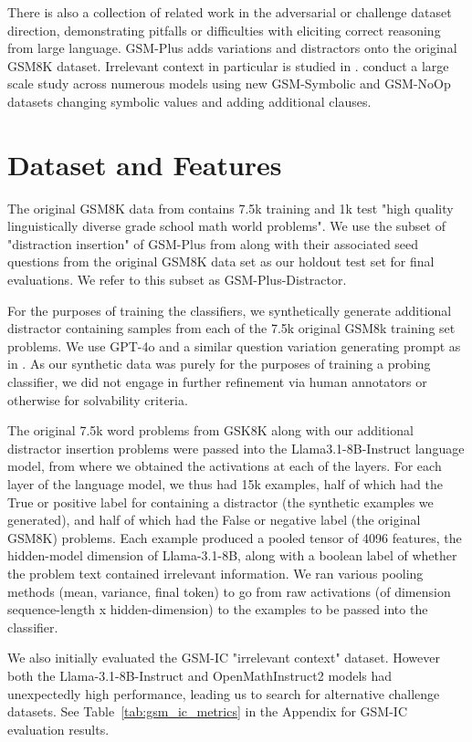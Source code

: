 \documentclass{article}
\begin{document}
There is also a collection of related work in the adversarial or challenge dataset direction, demonstrating pitfalls or difficulties with eliciting correct reasoning from large language. GSM-Plus \citep{li} adds variations and distractors onto the original GSM8K dataset. Irrelevant context in particular is studied in \citep{shi}. \citep{mirzadeh} conduct a large scale study across numerous models using new GSM-Symbolic and GSM-NoOp datasets changing symbolic values and adding additional clauses.

\section{Dataset and Features}

The original GSM8K data from \citep{cobbe} contains 7.5k training and 1k test "high quality linguistically diverse grade school math world problems". We use the subset of "distraction insertion" of GSM-Plus from \citep{li} along with their associated seed questions from the original GSM8K data set as our holdout test set for final evaluations. We refer to this subset as GSM-Plus-Distractor.

For the purposes of training the classifiers, we synthetically generate additional distractor containing samples from each of the 7.5k original GSM8k training set problems. We use GPT-4o and a similar question variation generating prompt as in \citep{li}. As our synthetic data was purely for the purposes of training a probing classifier, we did not engage in further refinement via human annotators or otherwise for solvability criteria.

The original 7.5k word problems from GSK8K along with our additional distractor insertion problems were passed into the Llama3.1-8B-Instruct language model, from where we obtained the activations at each of the layers. For each layer of the language model, we thus had 15k examples, half of which had the True or positive label for containing a distractor (the synthetic examples we generated), and half of which had the False or negative label (the original GSM8K) problems. Each example produced a pooled tensor of 4096 features, the hidden-model dimension of Llama-3.1-8B, along with a boolean label of whether the problem text contained irrelevant information. We ran various pooling methods (mean, variance, final token) to go from raw activations (of dimension sequence-length x hidden-dimension) to the examples to be passed into the classifier.

We also initially evaluated the GSM-IC \citep{shi} "irrelevant context" dataset. However both the Llama-3.1-8B-Instruct and OpenMathInstruct2 models had unexpectedly high performance, leading us to search for alternative challenge datasets. See Table~\ref{tab:gsm_ic_metrics} in the Appendix for GSM-IC evaluation results.
\end{document}
